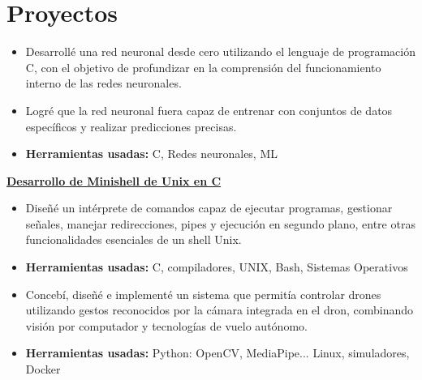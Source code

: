 \documentclass[letterpaper]{cv} %
\begin{document}
\section{Proyectos}
\textbf{\underline{}}
{\begin{itemize}
        \item Desarrollé una red neuronal desde cero utilizando el lenguaje de programación C, con el objetivo de profundizar en la comprensión del funcionamiento interno de las redes neuronales.
        \item Logré que la red neuronal fuera capaz de entrenar con conjuntos de datos específicos y realizar predicciones precisas.
        \item \textbf{Herramientas usadas:} C, Redes neuronales, ML
\end{itemize}}
\textbf{\underline{Desarrollo de Minishell de Unix en C}}
{\begin{itemize}
        \item Diseñé un intérprete de comandos capaz de ejecutar programas, gestionar señales, manejar redirecciones, pipes y ejecución en segundo plano, entre otras funcionalidades esenciales de un shell Unix.
        \item \textbf{Herramientas usadas:} C, compiladores, UNIX, Bash, Sistemas Operativos
\end{itemize}}
\textbf{\underline{}}
{\begin{itemize}
        \item Concebí, diseñé e implementé un sistema que permitía controlar drones utilizando gestos reconocidos por la cámara integrada en el dron, combinando visión por computador y tecnologías de vuelo autónomo.
        \item \textbf{Herramientas usadas:} Python: OpenCV, MediaPipe... Linux, simuladores, Docker
\end{itemize}}
\end{document}

